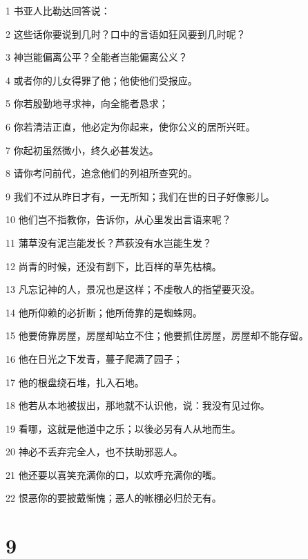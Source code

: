 \par 1 书亚人比勒达回答说：
\par 2 这些话你要说到几时？口中的言语如狂风要到几时呢？
\par 3 神岂能偏离公平？全能者岂能偏离公义？
\par 4 或者你的儿女得罪了他；他使他们受报应。
\par 5 你若殷勤地寻求神，向全能者恳求；
\par 6 你若清洁正直，他必定为你起来，使你公义的居所兴旺。
\par 7 你起初虽然微小，终久必甚发达。
\par 8 请你考问前代，追念他们的列祖所查究的。
\par 9 我们不过从昨日才有，一无所知；我们在世的日子好像影儿。
\par 10 他们岂不指教你，告诉你，从心里发出言语来呢？
\par 11 蒲草没有泥岂能发长？芦荻没有水岂能生发？
\par 12 尚青的时候，还没有割下，比百样的草先枯槁。
\par 13 凡忘记神的人，景况也是这样；不虔敬人的指望要灭没。
\par 14 他所仰赖的必折断；他所倚靠的是蜘蛛网。
\par 15 他要倚靠房屋，房屋却站立不住；他要抓住房屋，房屋却不能存留。
\par 16 他在日光之下发青，蔓子爬满了园子；
\par 17 他的根盘绕石堆，扎入石地。
\par 18 他若从本地被拔出，那地就不认识他，说：我没有见过你。
\par 19 看哪，这就是他道中之乐；以後必另有人从地而生。
\par 20 神必不丢弃完全人，也不扶助邪恶人。
\par 21 他还要以喜笑充满你的口，以欢呼充满你的嘴。
\par 22 恨恶你的要披戴惭愧；恶人的帐棚必归於无有。

\chapter{9}


